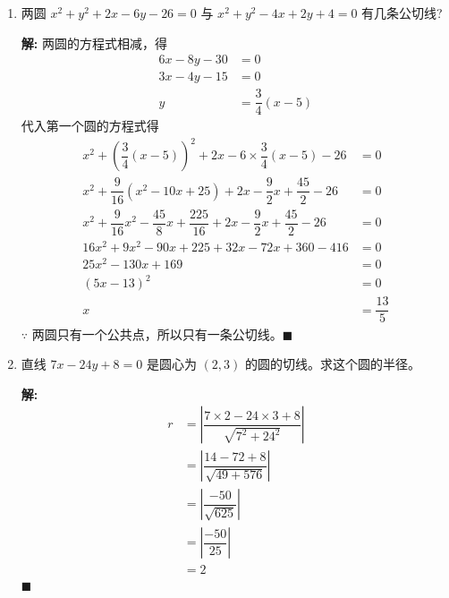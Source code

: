 \documentclass[10pt]{article}
\newcommand{\sol}{\textbf{解:} }
\begin{document}
\begin{enumerate}[leftmargin=*]
  \item 两圆 $x^{2}+y^{2}+2 x-6 y-26=0$ 与 $x^{2}+y^{2}-4 x+2 y+4=0$ 有几条公切线?

        \sol{}
        两圆的方程式相减，得
        \begin{align*}
          6x - 8y - 30 & = 0                   \\
          3x - 4y - 15 & = 0                   \\
          y            & = \dfrac{3}{4}(x - 5)
        \end{align*}
        代入第一个圆的方程式得
        \begin{align*}
          x^{2} + \left(\dfrac{3}{4}(x - 5)\right)^{2} + 2x - 6 \times \dfrac{3}{4}(x - 5) - 26                   & = 0             \\
          x^{2} + \dfrac{9}{16}(x^{2} - 10x + 25) + 2x - \dfrac{9}{2}x + \dfrac{45}{2} - 26                       & = 0             \\
          x^{2} + \dfrac{9}{16}x^{2} - \dfrac{45}{8}x + \dfrac{225}{16} + 2x - \dfrac{9}{2}x + \dfrac{45}{2} - 26 & = 0             \\
          16x^{2} + 9x^{2} - 90x + 225 + 32x - 72x + 360 - 416                                                    & = 0             \\
          25x^{2} - 130x + 169                                                                                    & = 0             \\
          (5x - 13)^{2}                                                                                           & = 0             \\
          x                                                                                                       & = \dfrac{13}{5}
        \end{align*}
        $\because$ 两圆只有一个公共点，所以只有一条公切线。\hfill$\blacksquare$

  \item 直线 $7 x-24 y+8=0$ 是圆心为 $(2,3)$ 的圆的切线。求这个圆的半径。

        \sol{}
        \begin{align*}
          r & = \left\vert \dfrac{7 \times 2 - 24 \times 3 + 8}{\sqrt{7^{2} + 24^{2}}} \right\vert \\
            & = \left\vert \dfrac{14 - 72 + 8}{\sqrt{49 + 576}} \right\vert                        \\
            & = \left\vert \dfrac{-50}{\sqrt{625}} \right\vert                                     \\
            & = \left\vert \dfrac{-50}{25} \right\vert                                             \\
            & = 2
        \end{align*} \hfill$\blacksquare$


\end{enumerate}
\end{document}
